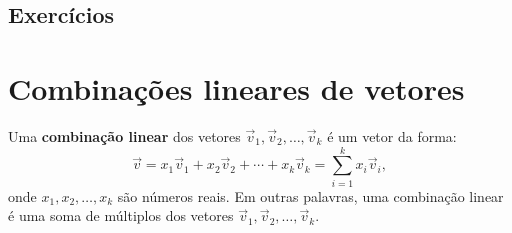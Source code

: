 \documentclass[../livro.tex]{subfiles}  %
\begin{document}
\construirExeresol

\subsection*{Exercícios}

\construirExer


\section{Combinações lineares de vetores}

Uma \textbf{combinação linear} dos vetores $\vec{v}_1, \vec{v}_2, \dots, \vec{v}_k$ é um vetor da forma:
\begin{equation}
\vec{v} = x_1 \vec{v}_1 + x_2 \vec{v}_2 + \cdots + x_k \vec{v}_k = \sum_{i=1}^k x_i \vec{v}_i,
\end{equation} onde $x_1, x_2, \dots, x_k$ são números reais. Em outras palavras, uma combinação linear é uma soma de múltiplos dos vetores $\vec{v}_1, \vec{v}_2, \dots, \vec{v}_k$.
\end{document}
